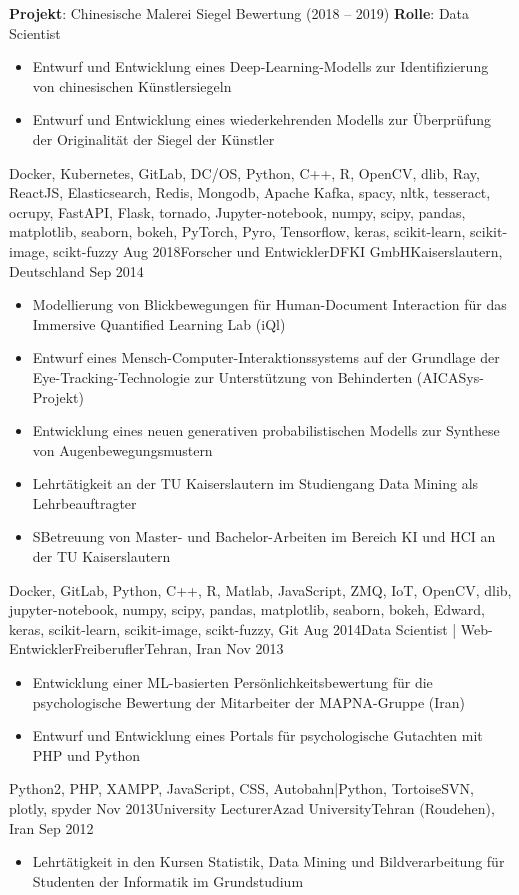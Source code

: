 \begin{experiences}
{    \textbf{Projekt}: Chinesische Malerei Siegel Bewertung (2018 -- 2019)\newline
    \textbf{Rolle}: Data Scientist
    \begin{itemize}
      \item Entwurf und Entwicklung eines Deep-Learning-Modells zur Identifizierung von chinesischen Künstlersiegeln
      \item Entwurf und Entwicklung eines wiederkehrenden Modells zur Überprüfung der Originalität der Siegel der Künstler
    \end{itemize}
  }
  {Docker, Kubernetes, GitLab, DC/OS, Python, C++, R,  OpenCV, dlib, Ray, ReactJS, Elasticsearch, Redis, Mongodb, Apache Kafka, spacy, nltk, tesseract, ocrupy, FastAPI, Flask, tornado, Jupyter-notebook, numpy, scipy, pandas, matplotlib, seaborn, bokeh, PyTorch, Pyro, Tensorflow, keras, scikit-learn, scikit-image, scikt-fuzzy}
  \emptySeparator
  \experience
  {Aug 2018}{Forscher und Entwickler}{DFKI GmbH}{Kaiserslautern, Deutschland}
  {Sep 2014} {
    \begin{itemize}
      \item Modellierung von Blickbewegungen für Human-Document Interaction für das Immersive Quantified Learning Lab (iQl)
      \item Entwurf eines Mensch-Computer-Interaktionssystems auf der Grundlage der Eye-Tracking-Technologie zur Unterstützung von Behinderten (AICASys-Projekt)
      \item Entwicklung eines neuen generativen probabilistischen Modells zur Synthese von Augenbewegungsmustern
      \item Lehrtätigkeit an der TU Kaiserslautern im Studiengang Data Mining als Lehrbeauftragter
      \item SBetreuung von Master- und Bachelor-Arbeiten im Bereich KI und HCI an der TU Kaiserslautern

    \end{itemize}
  }
  {Docker, GitLab, Python, C++, R, Matlab, JavaScript, ZMQ, IoT, OpenCV, dlib, jupyter-notebook, numpy, scipy, pandas, matplotlib, seaborn, bokeh, Edward, keras, scikit-learn, scikit-image, scikt-fuzzy, Git}
  \emptySeparator
  \experience
  {Aug 2014}{Data Scientist | Web-Entwickler}{Freiberufler}{Tehran, Iran}
  {Nov 2013} {
    \begin{itemize}
      \item Entwicklung einer ML-basierten Persönlichkeitsbewertung für die psychologische Bewertung der Mitarbeiter der MAPNA-Gruppe (Iran)
      \item Entwurf und Entwicklung eines Portals für psychologische Gutachten mit PHP und Python
    \end{itemize}
  }
  {Python2, PHP, XAMPP, JavaScript, CSS, Autobahn|Python, TortoiseSVN, plotly, spyder}
  \emptySeparator
  \experience
  {Nov 2013}{University Lecturer}{Azad University}{Tehran (Roudehen), Iran}
  {Sep 2012} {
    \begin{itemize}
      \item Lehrtätigkeit in den Kursen Statistik, Data Mining und Bildverarbeitung für Studenten der Informatik im Grundstudium


\end{itemize}}
\end{experiences}
